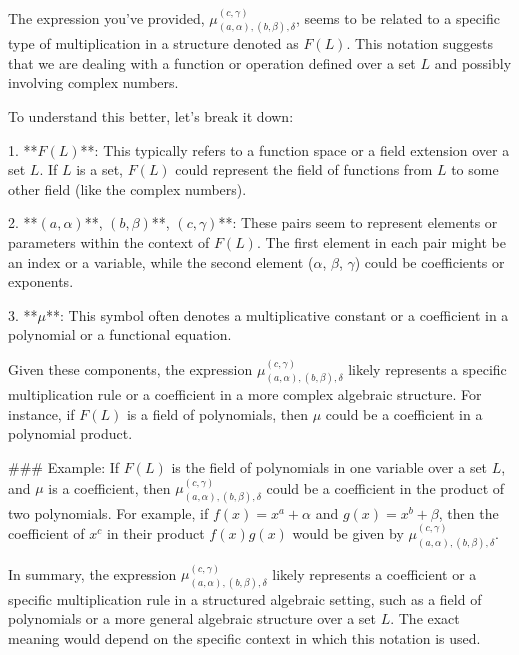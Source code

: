 The expression you've provided, \(\mu_{(a,\alpha),(b,\beta),\delta}^{(c,\gamma)}\), seems to be related to a specific type of multiplication in a structure denoted as \(F(L)\). This notation suggests that we are dealing with a function or operation defined over a set \(L\) and possibly involving complex numbers.

To understand this better, let's break it down:

1. **\(F(L)\)**: This typically refers to a function space or a field extension over a set \(L\). If \(L\) is a set, \(F(L)\) could represent the field of functions from \(L\) to some other field (like the complex numbers).

2. **\((a,\alpha)\)**, \((b,\beta)\)**, \((c,\gamma)\)**: These pairs seem to represent elements or parameters within the context of \(F(L)\). The first element in each pair might be an index or a variable, while the second element (\(\alpha\), \(\beta\), \(\gamma\)) could be coefficients or exponents.

3. **\(\mu\)**: This symbol often denotes a multiplicative constant or a coefficient in a polynomial or a functional equation.

Given these components, the expression \(\mu_{(a,\alpha),(b,\beta),\delta}^{(c,\gamma)}\) likely represents a specific multiplication rule or a coefficient in a more complex algebraic structure. For instance, if \(F(L)\) is a field of polynomials, then \(\mu\) could be a coefficient in a polynomial product.

### Example:
If \(F(L)\) is the field of polynomials in one variable over a set \(L\), and \(\mu\) is a coefficient, then \(\mu_{(a,\alpha),(b,\beta),\delta}^{(c,\gamma)}\) could be a coefficient in the product of two polynomials. For example, if \(f(x) = x^a + \alpha\) and \(g(x) = x^b + \beta\), then the coefficient of \(x^c\) in their product \(f(x)g(x)\) would be given by \(\mu_{(a,\alpha),(b,\beta),\delta}^{(c,\gamma)}\).

In summary, the expression \(\mu_{(a,\alpha),(b,\beta),\delta}^{(c,\gamma)}\) likely represents a coefficient or a specific multiplication rule in a structured algebraic setting, such as a field of polynomials or a more general algebraic structure over a set \(L\). The exact meaning would depend on the specific context in which this notation is used.